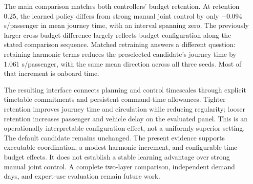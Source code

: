 \documentclass[letterpaper,journal]{IEEEtran}
\begin{document}
The main comparison matches both controllers' budget retention. At retention 0.25, the learned policy differs from strong manual joint control by only $-0.094$ s/passenger in mean journey time, with an interval spanning zero. The previously larger cross-budget difference largely reflects budget configuration along the stated comparison sequence. Matched retraining answers a different question: retaining harmonic terms reduces the preselected candidate's journey time by 1.061 s/passenger, with the same mean direction across all three seeds. Most of that increment is onboard time.

The resulting interface connects planning and control timescales through explicit timetable commitments and persistent command-time allowances. Tighter retention improves journey time and circulation while reducing regularity; looser retention increases passenger and vehicle delay on the evaluated panel. This is an operationally interpretable configuration effect, not a uniformly superior setting. The default candidate remains unchanged. The present evidence supports executable coordination, a modest harmonic increment, and configurable time-budget effects. It does not establish a stable learning advantage over strong manual joint control. A complete two-layer comparison, independent demand days, and expert-use evaluation remain future work.



\end{document}
